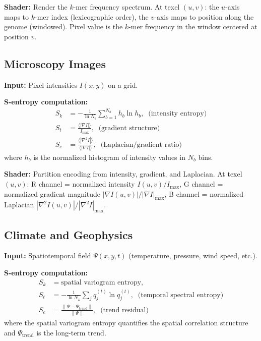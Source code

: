 \documentclass[11pt,twocolumn,a4paper]{article}
\newcommand{\Sk}{S_k}
\newcommand{\St}{S_t}
\newcommand{\Se}{S_e}
\begin{document}
\textbf{Shader:} Render the $k$-mer frequency spectrum. At texel
$(u,v)$: the $u$-axis maps to $k$-mer index (lexicographic order),
the $v$-axis maps to position along the genome (windowed). Pixel
value is the $k$-mer frequency in the window centered at
position $v$.

\subsection{Microscopy Images}
\label{sec:microscopy}

\textbf{Input:} Pixel intensities $I(x,y)$ on a grid.

\textbf{S-entropy computation:}
\begin{align}
\Sk &= -\frac{1}{\ln N_b}
  \sum_{b=1}^{N_b} h_b \ln h_b,
  \;\;\text{(intensity entropy)}
\label{eq:mic-Sk} \\
\St &= \frac{\langle |\nabla I| \rangle}{I_{\max}},
  \;\;\text{(gradient structure)}
\label{eq:mic-St} \\
\Se &= \frac{\langle |\nabla^2 I| \rangle}
  {\langle |\nabla I| \rangle},
  \;\;\text{(Laplacian/gradient ratio)}
\label{eq:mic-Se}
\end{align}
where $h_b$ is the normalized histogram of intensity values in
$N_b$ bins.

\textbf{Shader:} Partition encoding from intensity, gradient, and
Laplacian. At texel $(u,v)$: R channel = normalized intensity
$I(u,v)/I_{\max}$, G channel = normalized gradient magnitude
$|\nabla I(u,v)|/|\nabla I|_{\max}$, B channel = normalized
Laplacian $|\nabla^2 I(u,v)|/|\nabla^2 I|_{\max}$.

\subsection{Climate and Geophysics}
\label{sec:climate}

\textbf{Input:} Spatiotemporal field $\Psi(x,y,t)$ (temperature,
pressure, wind speed, etc.).

\textbf{S-entropy computation:}
\begin{align}
\Sk &= \text{spatial variogram entropy},
\label{eq:clim-Sk} \\
\St &= -\frac{1}{\ln N_\omega}
  \sum_j q_j^{(t)} \ln q_j^{(t)},
  \;\;\text{(temporal spectral entropy)}
\label{eq:clim-St} \\
\Se &= \frac{\|\Psi - \Psi_{\mathrm{trend}}\|}{\|\Psi\|},
  \;\;\text{(trend residual)}
\label{eq:clim-Se}
\end{align}
where the spatial variogram entropy quantifies the spatial
correlation structure and $\Psi_{\mathrm{trend}}$ is the long-term
trend.
\end{document}

